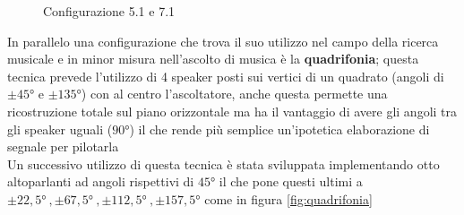 \documentclass[12pt,a4paper]{report}
\begin{document}
\begin{figure}[htbp]
	\caption {Configurazione 5.1 e 7.1} 
	\label{fig:5.1}
	\end{figure}
  
In parallelo una configurazione che trova il suo utilizzo nel campo della ricerca musicale e in minor misura nell'ascolto di musica è la \textbf{quadrifonia}; questa tecnica prevede l'utilizzo di 4 speaker posti sui vertici di un quadrato (angoli di $\pm45°$ e $\pm135°$) con al centro l'ascoltatore, anche questa permette una ricostruzione totale sul piano orizzontale ma ha il vantaggio di avere gli angoli tra gli speaker uguali ($90°$) il che rende più semplice un'ipotetica elaborazione di segnale per pilotarla\\

Un successivo utilizzo di questa tecnica è stata sviluppata implementando otto altoparlanti ad angoli rispettivi di $45°$ il che pone questi ultimi a $\pm22,5°\ , \pm67,5°\ , \pm112,5°\ , \pm157,5°$ come in figura \ref{fig:quadrifonia}
 
\end{document}
